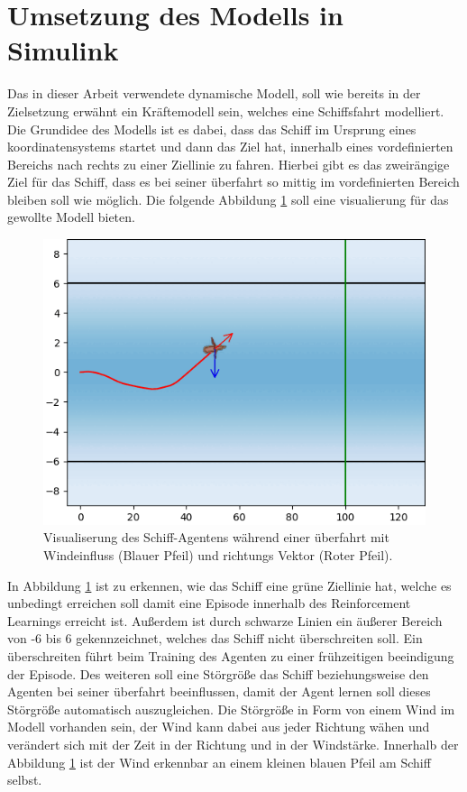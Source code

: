 \documentclass[]{iat}
\begin{document}
\section{Umsetzung des Modells in Simulink}
Das in dieser Arbeit verwendete dynamische Modell, soll wie bereits in der Zielsetzung erwähnt ein Kräftemodell sein, welches eine Schiffsfahrt modelliert. Die Grundidee des Modells ist es dabei, dass das Schiff im Ursprung eines koordinatensystems startet und dann das Ziel hat, innerhalb eines vordefinierten Bereichs nach rechts zu einer Ziellinie zu fahren. Hierbei gibt es das zweirängige Ziel für das Schiff, dass es bei seiner überfahrt so mittig im vordefinierten Bereich bleiben soll wie möglich. Die folgende Abbildung \ref*{abb:boat_frame_example_2} soll eine visualierung für das gewollte Modell bieten.
\begin{figure}[H]
    \includegraphics[width=\textwidth]{graphics/boat_frame_example_2.png}
    \centering
    \caption{Visualiserung des Schiff-Agentens während einer überfahrt mit Windeinfluss (Blauer Pfeil) und richtungs Vektor (Roter Pfeil).}
    \label{abb:boat_frame_example_2}
\end{figure}
In Abbildung \ref*{abb:boat_frame_example_2} ist zu erkennen, wie das Schiff eine grüne Ziellinie hat, welche es unbedingt erreichen soll damit eine Episode innerhalb des Reinforcement Learnings erreicht ist. Außerdem ist durch schwarze Linien ein äußerer Bereich von -6 bis 6 gekennzeichnet, welches das Schiff nicht überschreiten soll. Ein überschreiten führt beim Training des Agenten zu einer frühzeitigen beeindigung der Episode. Des weiteren soll eine Störgröße das Schiff beziehungsweise den Agenten bei seiner überfahrt beeinflussen, damit der Agent lernen soll dieses Störgröße automatisch auszugleichen. Die Störgröße in Form von einem Wind im Modell vorhanden sein, der Wind kann dabei aus jeder Richtung wähen und verändert sich mit der Zeit in der Richtung und in der Windstärke. Innerhalb der Abbildung \ref*{abb:boat_frame_example_2} ist der Wind erkennbar an einem kleinen blauen Pfeil am Schiff selbst.\\
\end{document}
